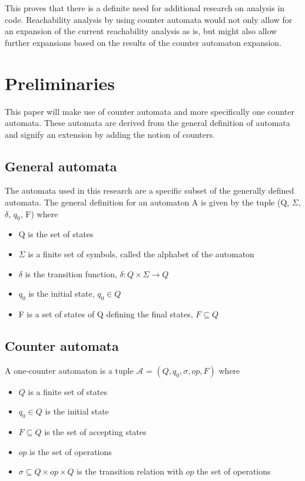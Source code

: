 \documentclass[12pt]{article}
\begin{document}
This proves that there is a definite need for additional research on analysis in code. Reachability analysis by using counter automata would not only allow for an expansion of the current reachability analysis as is, but might also allow further expansions based on the results of the counter automaton expansion.

\section{Preliminaries}
This paper will make use of counter automata and more specifically one counter automata. These automata are derived from the general definition of automata and signify an extension by adding the notion of counters.

\subsection{General automata}
The automata used in this research are a specific subset of the generally defined automata. The general definition for an automaton A is given by the tuple (Q, $\Sigma$, $\delta$, $q_0$, F) where
\begin{itemize}
	\item Q is the set of states
	\item $\Sigma$ is a finite set of symbols, called the alphabet of the automaton
	\item $\delta$ is the transition function, $\delta: Q \times \Sigma \rightarrow Q$
	\item $q_0$ is the initial state, $q_0 \in Q$
	\item F is a set of states of Q defining the final states, $F \subseteq Q$
\end{itemize}

\subsection{Counter automata}

A one-counter automaton is a tuple $\mathcal{A}$ = $(Q, q_0, \sigma, op, F)$ where
\begin{itemize}
	\item $Q$ is a finite set of states
	\item $q_0 \in Q$ is the initial state
	\item $F \subseteq Q$ is the set of accepting states
	\item $op$ is the set of operations
	\item $\sigma \subseteq Q \times op \times Q$ is the transition relation with $op$ the set of operations
\end{itemize}
\end{document}

